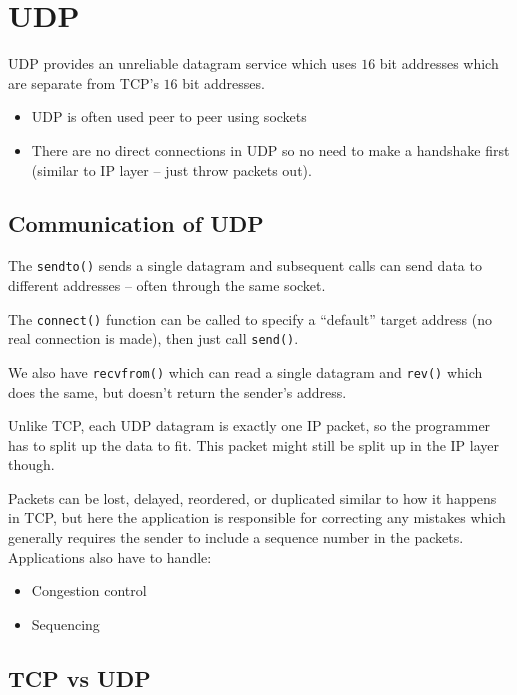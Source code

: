 \section{UDP}\label{sec:udp}

UDP provides an unreliable datagram service which uses \(16\) bit addresses which are separate from TCP's \(16\) bit addresses.
\begin{itemize}
	\item UDP is often used peer to peer using sockets
	\item There are no direct connections in UDP so no need to make a handshake first (similar to IP layer -- just throw packets out).
\end{itemize}

\subsection{Communication of UDP}\label{sub:communication_of_udp}

The \texttt{sendto()} sends a single datagram and subsequent calls can send data to different addresses -- often through the same socket.

The \texttt{connect()} function can be called to specify a ``default'' target address (no real connection is made), then just call \texttt{send()}.

We also have \texttt{recvfrom()} which can read a single datagram and \texttt{rev()} which does the same, but doesn't return the sender's address.

\begin{note}
	Unlike TCP, each UDP datagram is exactly one IP packet, so the programmer has to split up the data to fit.
	This packet might still be split up in the IP layer though.
\end{note}
\noindent
Packets can be lost, delayed, reordered, or duplicated similar to how it happens in TCP, but here the application is responsible for correcting any mistakes which generally requires the sender to include a sequence number in the packets.
Applications also have to handle:
\begin{itemize}
	\item Congestion control
	\item Sequencing
\end{itemize}

\subsection{TCP vs UDP}\label{sub:tcp_vs_udp}

